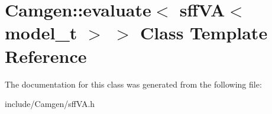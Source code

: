 \hypertarget{a00193}{\section{Camgen\-:\-:evaluate$<$ sff\-V\-A$<$ model\-\_\-t $>$ $>$ Class Template Reference}
\label{a00193}
}


The documentation for this class was generated from the following file\-:\begin{DoxyCompactItemize}
\item 
include/\-Camgen/sff\-V\-A.\-h\end{DoxyCompactItemize}
